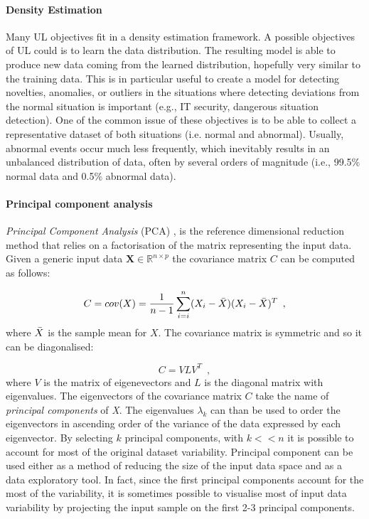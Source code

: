 \paragraph{Density Estimation}

Many UL objectives fit in a density estimation framework. A possible objectives of  UL could is to learn the data distribution. The resulting model is able to produce new data coming from the learned distribution, hopefully very similar to the training data. 
This is in particular useful to create a model for detecting novelties, anomalies, or outliers in the situations where detecting deviations from the normal situation is important (e.g., IT security, dangerous situation detection). One of the common issue of these objectives is to be able to collect a representative dataset of both situations (i.e. normal and abnormal). Usually, abnormal events occur much less frequently, which inevitably results in an unbalanced distribution of data, often by several orders of magnitude (i.e., 99.5\% normal data and 0.5\% abnormal data).


\paragraph{Principal component analysis} \label{Principal Component Analysis}

\textit{Principal Component Analysis} (PCA) \citep{pearson1901liii,hotelling1933analysis}, is the reference dimensional reduction method that relies on a factorisation of the matrix representing the input data. Given a generic input data $\mathbf{X} \in \mathbb{R}^{n \times p}$ the covariance matrix $C$ can be computed as follows: 

\begin{equation*} \label{eq:covariance}
    C = cov(X) = \frac{1}{n - 1} \sum_{i=i}^{n} (X_{i} - \Bar{X})(X_{i} - \Bar{X})^{T}
    \enspace,
\end{equation*}
%
where $\Bar{X}$ is the sample mean for $X$.
The covariance matrix is symmetric and so it can be diagonalised:

\begin{equation*}
    C = VLV^T
    \enspace,
\end{equation*}
%
where $V$ is the matrix of eigenevectors and $L$ is the diagonal matrix with eigenvalues. The eigenvectors of the covariance matrix $C$ take the name of \textit{principal components} of \textit{X}. The eigenvalues $\lambda_{k}$ can than be used to order the eigenvectors in ascending order of the variance of the data expressed by each eigenvector. By selecting $k$ principal components, with $k << n$ it is possible to account for most of the original dataset variability. Principal component can be used either as a method of reducing the size of the input data space and as a data exploratory tool. In fact, since the first principal components account for the most of the variability, it is sometimes possible to visualise most of input data variability by projecting the input sample on the first 2-3 principal components. 

